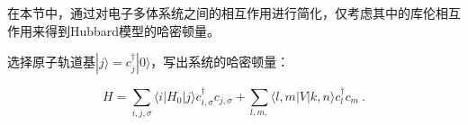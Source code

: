 
在本节中，通过对电子多体系统之间的相互作用进行简化，仅考虑其中的库伦相互作用来得到Hubbard模型的哈密顿量。

选择原子轨道基$|j\rangle =c_j^\dagger |0\rangle$，写出系统的哈密顿量：

\begin{equation}
H=\sum\limits_{i,j,\sigma}\langle i |H_0| j \rangle c_{i,\sigma}^\dagger c_{j,\sigma}+\sum\limits_{l,m,}\langle l,m|V|k,n\rangle c_l^\dagger  c_m~.
\end{equation}
